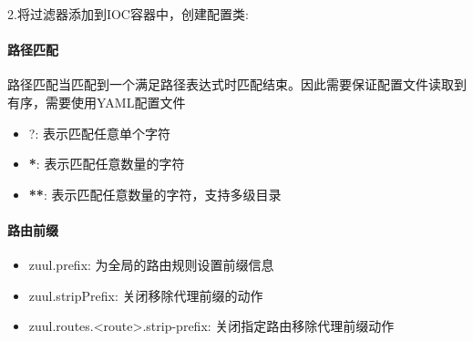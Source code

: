 \documentclass[letterpaper,10pt,english]{sphinxmanual}
\begin{document}
2.将过滤器添加到IOC容器中，创建配置类:

\begin{sphinxVerbatim}[commandchars=\\\{\}]
 
  
   

        
          

\end{sphinxVerbatim}


\paragraph{路径匹配}
\label{\detokenize{01.spring-cloud/04.zuul/zuul_01:id6}}
路径匹配当匹配到一个满足路径表达式时匹配结束。因此需要保证配置文件读取到有序，需要使用YAML配置文件
\begin{itemize}
\item {} 
?: 表示匹配任意单个字符

\item {} 
{\color{red}\bfseries{}*}: 表示匹配任意数量的字符

\item {} 
{\color{red}\bfseries{}**}: 表示匹配任意数量的字符，支持多级目录

\end{itemize}


\paragraph{路由前缀}
\label{\detokenize{01.spring-cloud/04.zuul/zuul_01:id11}}\begin{itemize}
\item {} 
zuul.prefix: 为全局的路由规则设置前缀信息

\item {} 
zuul.stripPrefix: 关闭移除代理前缀的动作

\item {} 
zuul.routes.\textless{}route\textgreater{}.strip-prefix: 关闭指定路由移除代理前缀动作

\end{itemize}
\end{document}
